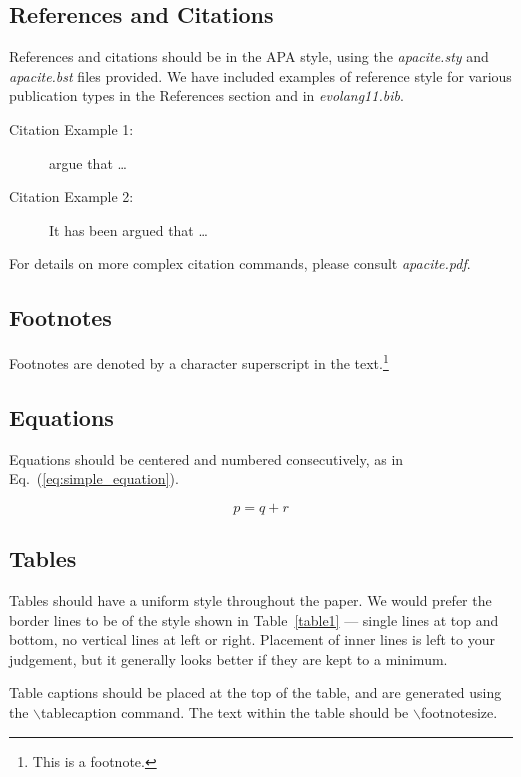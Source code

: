 \documentclass{evolang11}
\begin{document}
\subsection{References and Citations}

References and citations should be in the APA style, using the {\em
  apacite.sty} and {\em apacite.bst} files provided.  We have included
examples of reference style for various publication types in the
References section and in {\em evolang11.bib}.

\begin{description}
\item [Citation Example 1:]  argue that \ldots
\item [Citation Example 2:] It has been argued \cite{pinker_90_natural} that \ldots
\end{description}
\nocite{tomasello_03_constructing,hauser_03_uniquely}

For details on more complex citation commands, please consult {\em apacite.pdf}.

\subsection{Footnotes}

Footnotes are denoted by a character superscript in the
text.\footnote{This is a footnote.}

\subsection{Equations}

Equations should be centered and numbered consecutively, as in
Eq.~(\ref{eq:simple_equation}).

\begin{equation}
p = q + r
\label{eq:simple_equation}
\end{equation}

\subsection{Tables}

Tables should have a uniform style throughout the paper.  We would
prefer the border lines to be of the style shown in Table~\ref{table1}
--- single lines at top and bottom, no vertical lines at left or
right.  Placement of inner lines is left to your judgement, but it
generally looks better if they are kept to a minimum.

Table captions should be placed at the top of the table, and are
generated using the $\backslash$tablecaption command.  The text within
the table should be $\backslash$footnotesize.
\end{document}
